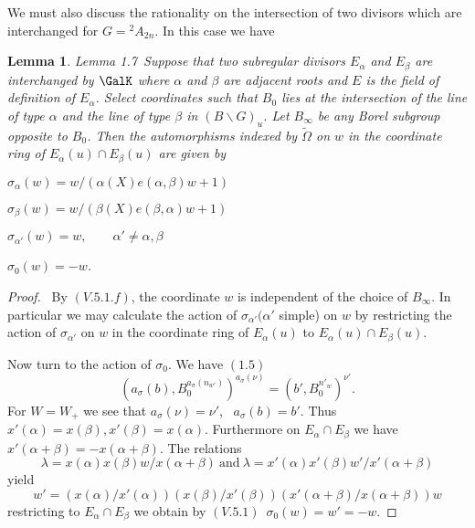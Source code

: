 \documentclass{memo-l}
\newtheorem{lemma}[theorem]{Lemma}
\theoremstyle{definition}
\theoremstyle{remark}
\numberwithin{section}{chapter}
\numberwithin{equation}{chapter}
\begin{document}
{\medskip}

   We must also discuss the rationality on the intersection of two divisors
which are interchanged for $G  = {}^{2}A_{2n}$.  In this case we have

\medpagebreak

\begin{lemma}{Lemma 1.7}\  Suppose that two subregular divisors
$E_{{\alpha}}$ and $E_{{\beta}}$ are interchanged by $\GalK$ where
${\alpha}$ and ${\beta}$ are adjacent roots and $E$ is the field of
definition of $E_{{\alpha}}$.  Select coordinates such that $B_{0}$ lies at
the intersection of the line of type ${\alpha}$ and the line of type
${\beta}$ in $(B\backslash G)_{u}$.  Let $B_{ \infty}$ be any Borel
subgroup opposite to $B_{0}$.  Then the automorphisms indexed by $\tilde{\Omega}$ 
on $w$
in the coordinate ring of $E_{{\alpha}}(u)  \cap  E_{{\beta}}(u)$ are given
by

   ${\sigma}_{{\alpha}}(w)  =  w/({\alpha}(X)e({\alpha},{\beta})w+1)$

   ${\sigma}_{{\beta}}(w)  =  w/({\beta}(X)e({\beta},{\alpha})w+1)$

   ${\sigma}_{{\alpha}'}(w)  =  w, \qquad {\alpha}' \ne {\alpha},{\beta}$

   ${\sigma}_{0}(w)  =  -w$.
\end{lemma}

\medpagebreak

\begin{proof} \  By $(V.5.1.f)$, the coordinate $w$ is independent of
the choice of $B_{{\infty}}$.  In particular we may calculate the action of
${\sigma}_{{\alpha}'} ({\alpha}'$ simple) on $w$ by restricting the action
of ${\sigma}_{{\alpha}'}$ on $w$ in the coordinate ring of
$E_{{\alpha}}(u)$ to $E_{{\alpha}}(u)  \cap  E_{{\beta}}(u)$.

   Now turn to the action of ${\sigma}_{0}$.  We have $(1.5)$
$$
(a_{{\sigma}}(b),B_{0}^{a_{{\sigma}}(n_{w'})})^{a_{{\sigma}}({\nu})} 
=  (b',B_{0}^{n'_{w}})^{{\nu}'} .
$$
For $W = W_{+}$ we see that $a_{{\sigma}}({\nu})  =  {\nu}'$, \ $a_{{\sigma}}(b)  = 
b'$.  Thus $x'({\alpha})  =  x({\beta}), x'({\beta})  =  x({\alpha})$.
Furthermore on $E_{{\alpha}}  \cap  E_{{\beta}}$ we have
$x'({\alpha}+{\beta})  =  -x({\alpha}+{\beta})$.  The relations
$$
{\lambda}  =  x({\alpha})x({\beta})w/x({\alpha}+{\beta})\ {\text{and}}\ 
{\lambda}  =  x'({\alpha})x'({\beta})w'/x'({\alpha}+{\beta})
$$
yield
$$
w'  = 
(x({\alpha})/x'({\alpha}))(x({\beta})/x'({\beta}))(x'({\alpha}+{\beta})/x({\alpha}+{\beta}))w
$$
restricting to $E_{{\alpha}}  \cap  E_{{\beta}}$ we obtain by $(V.5.1)$\
${\sigma}_{0}(w)  =  w'  =  -w$.
\end{proof}
\end{document}

